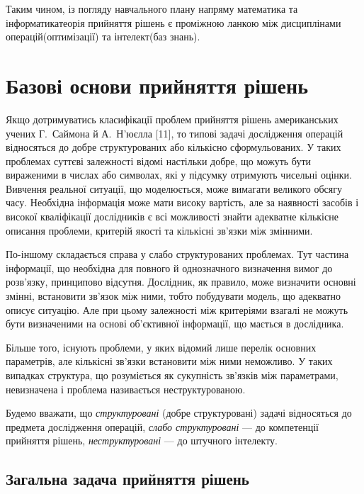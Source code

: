 \documentclass[a4paper, 12pt]{article}
\begin{document}
Таким чином, із погляду навчального плану напряму  математика та інформатика\guillemotright теорія прийняття рішень є проміжною ланкою між дисциплінами  операцій\guillemotright ( оптимізації\guillemotright) та  інтелект\guillemotright ( баз знань\guillemotright).

\section{Базові основи прийняття рішень}

Якщо дотримуватись класифікації проблем прийняття рішень американських учених Г.~Саймона й А.~Н'юєлла [11], то типові задачі дослідження операцій відносяться до добре структурованих або кількісно сформульованих. У таких проблемах суттєві залежності відомі настільки добре, що можуть бути вираженими в числах або символах, які у підсумку отримують чисельні оцінки. Вивчення реальної ситуації, що моделюється, може вимагати великого обсягу часу. Необхідна інформація може мати високу вартість, але за наявності засобів і високої кваліфікації дослідників є всі можливості знайти адекватне кількісне описання проблеми, критерій якості та кількісні зв'язки між змінними. \medskip

По-іншому складається справа у слабо структурованих проблемах. Тут частина інформації, що необхідна для повного й однозначного визначення вимог до розв'язку, принципово відсутня. Дослідник, як правило, може визначити основні змінні, встановити зв'язок між ними, тобто побудувати модель, що адекватно описує ситуацію. Але при цьому залежності між критеріями взагалі не можуть бути визначеними на основі об'єктивної інформації, що мається в дослідника. \medskip

Більше того, існують проблеми, у яких відомий лише перелік основних параметрів, але кількісні зв'язки встановити між ними неможливо. У таких випадках структура, що розуміється як сукупність зв'язків між параметрами, невизначена і проблема називається неструктурованою. \medskip

\begin{definition}
	Будемо вважати, що \textit{структуровані} (добре структуровані) задачі відносяться до предмета дослідження операцій, \textit{слабо структуровані} --- до компетенції прийняття рішень, \textit{неструктуровані} --- до штучного інтелекту.
\end{definition}

\subsection{Загальна задача прийняття рішень}
\end{document}
